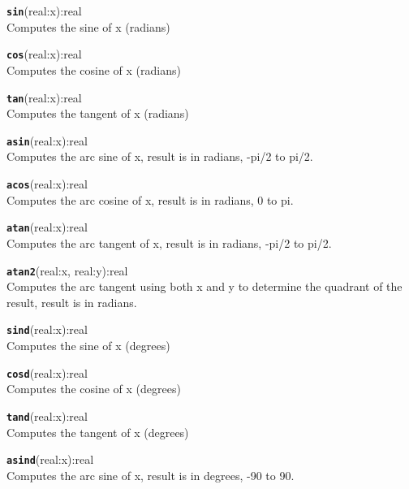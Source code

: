\hrulefill

\texttt{{\large\textbf{sin}}}\textsf{(real:x):real}\\
 Computes the sine of x (radians)

\hrulefill

\texttt{{\large\textbf{cos}}}\textsf{(real:x):real}\\
 Computes the cosine of x (radians)

\hrulefill

\texttt{{\large\textbf{tan}}}\textsf{(real:x):real}\\
 Computes the tangent of x (radians)

\hrulefill

\texttt{{\large\textbf{asin}}}\textsf{(real:x):real}\\
 Computes the arc sine of x, result is in radians, -pi/2 to pi/2.

\hrulefill

\texttt{{\large\textbf{acos}}}\textsf{(real:x):real}\\
 Computes the arc cosine of x, result is in radians, 0 to pi.

\hrulefill

\texttt{{\large\textbf{atan}}}\textsf{(real:x):real}\\
 Computes the arc tangent of x, result is in radians, -pi/2 to pi/2.

\hrulefill

\texttt{{\large\textbf{atan2}}}\textsf{(real:x, real:y):real}\\
 Computes the arc tangent using both x and y to determine the quadrant of the result, result is in radians.

\hrulefill

\texttt{{\large\textbf{sind}}}\textsf{(real:x):real}\\
 Computes the sine of x (degrees)

\hrulefill

\texttt{{\large\textbf{cosd}}}\textsf{(real:x):real}\\
 Computes the cosine of x (degrees)

\hrulefill

\texttt{{\large\textbf{tand}}}\textsf{(real:x):real}\\
 Computes the tangent of x (degrees)

\hrulefill

\texttt{{\large\textbf{asind}}}\textsf{(real:x):real}\\
 Computes the arc sine of x, result is in degrees, -90 to 90.

